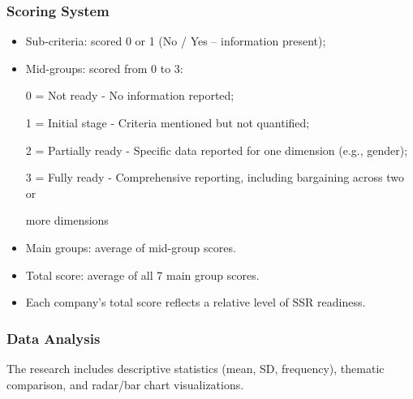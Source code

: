 \subsubsection{Scoring System}
    \begin{itemize}
        \item Sub-criteria: scored 0 or 1 (No / Yes -- information present);
        \item Mid-groups: scored from 0 to 3:
        
        \hspace{1cm} 0 = Not ready - No information reported;
        
        \hspace{1cm} 1 = Initial stage - Criteria mentioned but not quantified;
        
        \hspace{1cm} 2 = Partially ready - Specific data reported for one dimension (e.g., gender);
        
        \hspace{1cm} 3 = Fully ready - Comprehensive reporting, including bargaining across two or 
        
        \hspace{1cm} more dimensions

        \item Main groups: average of mid-group scores.
        \item Total score: average of all 7 main group scores.
        \item Each company's total score reflects a relative level of SSR readiness.
    \end{itemize}

\subsubsection{Data Analysis}
The research includes descriptive statistics (mean, SD, frequency), thematic comparison, and radar/bar chart visualizations.


